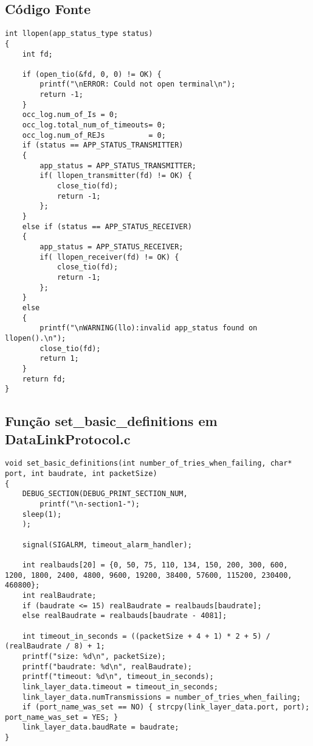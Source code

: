 \documentclass[11pt,a4paper,reqno]{report}
\numberwithin{equation}{section}
\begin{document}
\begin{appendices}

\chapter{Código Fonte}

\begin{lstlisting}
int llopen(app_status_type status)
{
	int fd;

	if (open_tio(&fd, 0, 0) != OK) {
		printf("\nERROR: Could not open terminal\n");
		return -1;
	}
	occ_log.num_of_Is = 0;
	occ_log.total_num_of_timeouts= 0;
	occ_log.num_of_REJs			 = 0;
	if (status == APP_STATUS_TRANSMITTER)
	{
		app_status = APP_STATUS_TRANSMITTER;
		if( llopen_transmitter(fd) != OK) {
			close_tio(fd);
			return -1;
		};
	}
	else if (status == APP_STATUS_RECEIVER)
	{
		app_status = APP_STATUS_RECEIVER;
		if( llopen_receiver(fd) != OK) {
			close_tio(fd);
			return -1;
		};
	}
	else
	{
		printf("\nWARNING(llo):invalid app_status found on llopen().\n");
		close_tio(fd);
		return 1;
	}
	return fd;
}
\end{lstlisting}

\section{Função set\_basic\_definitions em DataLinkProtocol.c }
\label{setbasicdefinitions}
\begin{lstlisting}
void set_basic_definitions(int number_of_tries_when_failing, char* port, int baudrate, int packetSize)
{
	DEBUG_SECTION(DEBUG_PRINT_SECTION_NUM,
		printf("\n-section1-");
	sleep(1);
	);

	signal(SIGALRM, timeout_alarm_handler);
	
	int realbauds[20] = {0, 50, 75, 110, 134, 150, 200, 300, 600, 1200, 1800, 2400, 4800, 9600, 19200, 38400, 57600, 115200, 230400, 460800};
	int realBaudrate;
	if (baudrate <= 15) realBaudrate = realbauds[baudrate];
	else realBaudrate = realbauds[baudrate - 4081];
	
	int timeout_in_seconds = ((packetSize + 4 + 1) * 2 + 5) / (realBaudrate / 8) + 1;
	printf("size: %d\n", packetSize);
	printf("baudrate: %d\n", realBaudrate);
	printf("timeout: %d\n", timeout_in_seconds);
	link_layer_data.timeout = timeout_in_seconds;
	link_layer_data.numTransmissions = number_of_tries_when_failing;
	if (port_name_was_set == NO) { strcpy(link_layer_data.port, port); port_name_was_set = YES; }
	link_layer_data.baudRate = baudrate;
}
\end{lstlisting}


\end{appendices}
\end{document}
